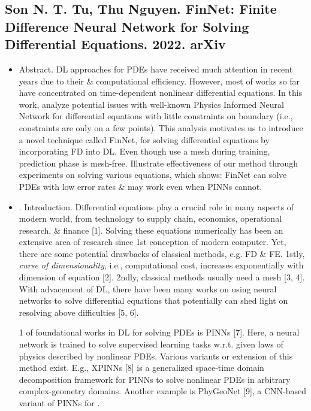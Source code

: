 \documentclass{article}
\begin{document}
\subsection{{\sc Son N. T. Tu, Thu Nguyen}. FinNet: Finite Difference Neural Network for Solving Differential Equations. 2022. arXiv}
{\sf[2 citations]}
\begin{itemize}
	\item {\sf Abstract.} DL approaches for PDEs have received much attention in recent years due to their  \& computational efficiency. However, most of works so far have concentrated on time-dependent nonlinear differential equations. In this work, analyze potential issues with well-known Physics Informed Neural Network for differential equations with little constraints on boundary (i.e., constraints are only on a few points). This analysis motivates us to introduce a novel technique called FinNet, for solving differential equations by incorporating FD into DL. Even though use a mesh during training, prediction phase is mesh-free. Illustrate effectiveness of our method through experiments on solving various equations, which shows: FinNet can solve PDEs with low error rates \& may work even when PINNs cannot.
	\item {. Introduction.} Differential equations play a crucial role in many aspects of modern world, from technology to supply chain, economics, operational research, \& finance [1]. Solving these equations numerically has been an extensive area of research since 1st conception of modern computer. Yet, there are some potential drawbacks of classical methods, e.g. FD \& FE. 1stly, {\it curse of dimensionality}, i.e., computational cost, increases exponentially with dimension of equation [2]. 2ndly, classical methods usually need a mesh [3, 4]. With advacement of DL, there have been many works on using neural networks to solve differential equations that potentially can shed light on resolving above difficulties [5, 6].

	1 of foundational works in DL for solving PDEs is PINNs [7]. Here, a neural network is trained to solve supervised learning tasks w.r.t. given laws of physics described by nonlinear PDEs. Various variants or extension of this method exist. E.g., XPINNs [8] is a generalized space-time domain decomposition framework for PINNs to solve nonlinear PDEs in arbitrary complex-geometry domains. Another example is PhyGeoNet [9], a CNN-based variant of PINNs for .


\end{itemize}
\end{document}
